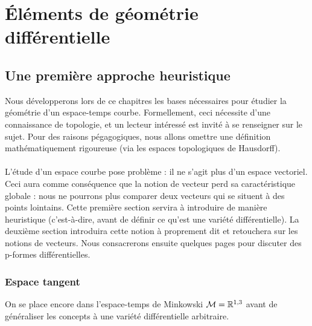 
\chapter{Éléments de géométrie différentielle}

\section{Une première approche heuristique}
Nous développerons lors de ce chapitres les bases nécessaires pour étudier la géométrie d'un espace-temps courbe. Formellement, ceci nécessite d'une connaissance de topologie, et un lecteur intéressé est invité à se renseigner sur le sujet. Pour des raisons pégagogiques, nous allons omettre une définition mathématiquement rigoureuse (via les espaces topologiques de Hausdorff). \\
\\
L'étude d'un espace courbe pose problème : il ne s'agit plus d'un espace vectoriel. Ceci aura comme conséquence que la notion de vecteur perd sa caractéristique globale : nous ne pourrons plus comparer deux vecteurs qui se situent à des points lointains. Cette première section servira à introduire de manière heuristique (c'est-à-dire, avant de définir ce qu'est une variété différentielle). La deuxième section introduira cette notion à proprement dit et retouchera sur les notions de vecteurs. Nous consacrerons ensuite quelques pages pour discuter des p-formes différentielles.
\subsection{Espace tangent}
On se place encore dans l'espace-temps de Minkowski $\mathcal{M}= \mathbb{R}^{1,3}$ avant de généraliser les concepts à une variété différentielle arbitraire.

